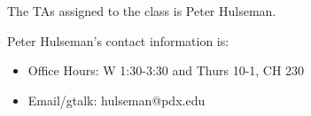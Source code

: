 The TAs assigned to the class is Peter Hulseman. 

Peter Hulseman's contact information is:
\begin{itemize}
\item Office Hours: W 1:30-3:30 and Thurs 10-1, CH 230
\item Email/gtalk: hulseman@pdx.edu
\end{itemize}
